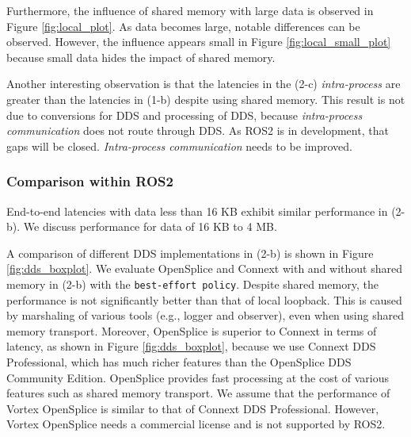 \documentclass{sig-alternate-05-2015}
\begin{document}
Furthermore, the influence of shared memory with large data is observed in Figure \ref{fig:local_plot}.
As data becomes large, notable differences can be observed.
However, the influence appears small in Figure \ref{fig:local_small_plot} because small data hides the impact of shared memory.

Another interesting observation is that the latencies in the (2-c) \emph{intra-process} are greater than the latencies in (1-b) despite using shared memory.
This result is not due to conversions for DDS and processing of DDS, because \emph{intra-process communication} does not route through DDS.
As ROS2 is in development, that gaps will be closed.
\emph{Intra-process communication} needs to be improved.

\subsubsection{Comparison within ROS2}
\label{sec:ros2}
End-to-end latencies with data less than 16 KB exhibit similar performance in (2-b).
We discuss performance for data of 16 KB to 4 MB.

A comparison of different DDS implementations in (2-b) is shown in Figure \ref{fig:dds_boxplot}.
We evaluate OpenSplice and Connext with and without shared memory in (2-b) with the \texttt{best-effort policy}.
Despite shared memory, the performance is not significantly better than that of local loopback. 
This is caused by marshaling of various tools (e.g., logger and observer), even when using shared memory transport.
Moreover, OpenSplice is superior to Connext in terms of latency, as shown in Figure \ref{fig:dds_boxplot}, because we use Connext DDS Professional, which has much richer features than the OpenSplice DDS Community Edition.
OpenSplice provides fast processing at the cost of various features such as shared memory transport.
We assume that the performance of Vortex OpenSplice is similar to that of Connext DDS Professional.
However, Vortex OpenSplice needs a commercial license and is not supported by ROS2.
\end{document}

